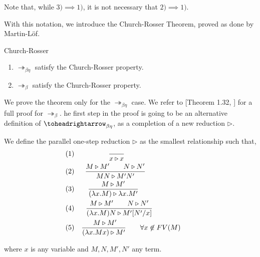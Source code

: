 \begin{remark} 
  Note that, while $3)\implies 1)$, it is not necessary that $2)\implies 1)$.
\end{remark}


With this notation, we introduce the Church-Rosser Theorem, proved as done by Martin-Löf.

\begin{theorem}{Church-Rosser}\label{theo:church-rosser}
  \begin{enumerate}
  \item $\twoheadrightarrow_{\beta\eta}$ satisfy the Church-Rosser property.
  \item $\twoheadrightarrow_{\beta}$ satisfy the Church-Rosser property.
  \end{enumerate}
\end{theorem}




We prove the theorem only for the $ \twoheadrightarrow_{\beta\eta}$ case. We refer to [Theorem 1.32, \cite{hindley2008lambda}] for a full proof for $\twoheadrightarrow_\beta$. he first step in the proof is going to be an alternative definition of $\toheadrightarrow_{\beta\eta}$, as a completion of a new reduction $\triangleright$.
\begin{definition}
  We define the parallel one-step reduction  $\triangleright$ as the smallest relationship such that,\\
  \begin{align*}
    (1)&& {\displaystyle \over x \triangleright x}\qquad\qquad\qquad\qquad\qquad\\
    (2)&& { M \triangleright M'\qquad N\triangleright N'  \over MN \triangleright M'N' }\qquad\qquad\qquad\ \  \ \\
    (3)&&{M \triangleright M' \over(\lambda x.M) \triangleright \lambda x.M'}\qquad\qquad\qquad\qquad\\
    (4)&& {M \triangleright M'\qquad N \triangleright N' \over (\lambda x.M)N \triangleright M'[N'/x]}\qquad\qquad\qquad\\
    (5)&& {\ M\triangleright M'\over(\lambda x.Mx) \triangleright M'} \qquad \forall x \not  \in FV(M)\qquad
  \end{align*}



  where $x$ is any variable and $M,N,M',N'$ any term.
\end{definition}

